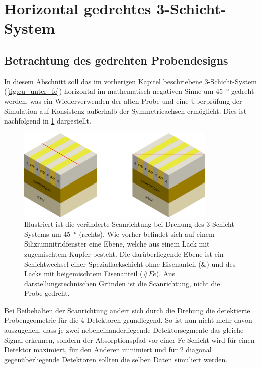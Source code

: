 \section{Horizontal gedrehtes 3-Schicht-System}
\subsection{Betrachtung des gedrehten Probendesigns}
In diesem Abschnitt soll das im vorherigen Kapitel beschriebene 3-Schicht-System (\cref{fig:cu_unter_fe}) horizontal im mathematisch negativen Sinne um \SI{45}{\degree} gedreht werden, was ein Wiederverwenden der alten Probe und eine Überprüfung der Simulation auf Konsistenz außerhalb der Symmetrieachsen ermöglicht. Dies ist nachfolgend in \cref{fig:45grad} dargestellt.

\begin{figure}[H] 
  \centering
     \includegraphics[width=0.85\textwidth]{illustrations/45grad.png}
  \caption[Gedrehtes 3-Schicht-System]{Illustriert ist die veränderte Scanrichtung bei Drehung des 3-Schicht-Systems um \SI{45}{\degree} (rechts). Wie vorher befindet sich auf einem Siliziumnitridfenster eine Ebene, welche aus einem Lack mit zugemischtem Kupfer besteht. Die darüberliegende Ebene ist ein Schichtwechsel einer Speziallackschicht ohne Eisenanteil ($\&$) und des Lacks mit beigemischtem Eisenanteil ($\#Fe$). Aus darstellungstechnischen Gründen ist die Scanrichtung, nicht die Probe gedreht.}
  \label{fig:45grad}
\end{figure}


Bei Beibehalten der Scanrichtung ändert sich durch die Drehung die detektierte Probengeometrie für die 4 Detektoren grundlegend. So ist nun nicht mehr davon auszugehen, dass je zwei nebeneinanderliegende Detektorsegmente das gleiche Signal erkennen, sondern der Absorptionspfad vor einer Fe-Schicht wird für einen Detektor maximiert, für den Anderen minimiert und für 2 diagonal gegenüberliegende Detektoren sollten die selben Daten simuliert werden.

